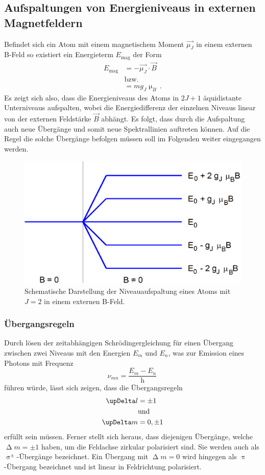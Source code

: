 \subsection{Aufspaltungen von Energieniveaus in externen Magnetfeldern}
Befindet sich ein Atom mit einem magnetischem Moment $\vec{\mu_J}$ in einem externen B-Feld so existiert ein Energieterm $E_\text{mag}$ der Form
\begin{align}
E_\text{mag}&=-\vec{\mu_J}\cdot\vec{B}\\
&\text{bzw.}\nonumber\\
&=mg_J\upmu_B\,.
\end{align}
Es zeigt sich also, dass die Energieniveaus des Atoms in $2J+1$ äquidistante Unterniveaus aufspalten, wobei die Energiedifferenz der einzelnen Niveaus linear von der externen Feldstärke $\vec{B}$ abhängt.
Es folgt, dass durch die Aufspaltung auch neue Übergänge und somit neue Spektrallinien auftreten können. Auf die Regel die solche Übergänge befolgen müssen soll im Folgenden weiter eingegangen werden.
\begin{figure}
  \centering
  \includegraphics[width=\textwidth]{Bilder/t1.png}
  \caption{Schematische Darstellung der Niveauaufspaltung eines Atoms mit $J=2$ in einem externen B-Feld.\cite{anleitung}}
\end{figure}
\subsubsection{Übergangsregeln}
Durch lösen der zeitabhängigen Schrödingergleichung für einen Übergang zwischen zwei Niveaus mit den Energien $E_m$ und $E_n$, was zur Emission eines Photons mit Frequenz
\begin{equation}
\nu_{mn}=\frac{E_m-E_n}{\text{h}}\,
\end{equation}
führen würde, lässt sich zeigen, dass die Übergangsregeln
\begin{align}
\upDelta l&=\pm1\newline\\
&\text{und}\nonumber\\
\upDelta m &=0,\pm1
\end{align}
erfüllt sein müssen. Ferner stellt sich heraus, dass diejenigen Übergänge, welche $\upDelta m=\pm 1$ haben, um die Feldachse zirkular polarisiert sind. Sie werden auch als $\upsigma^\pm$-Übergänge bezeichnet. Ein Übergang mit $\upDelta m=0$ wird hingegen als $\uppi$-Übergang bezeichnet und ist linear in Feldrichtung polarisiert.
